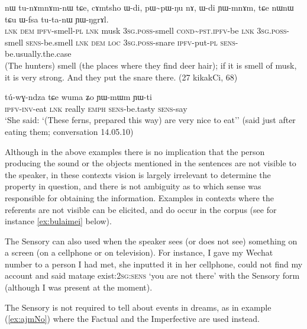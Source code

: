 \documentclass[oldfontcommands,oneside,a4paper,11pt]{article}
\newcommand{\ipa}[1]{{\phon \mbox{#1}}} %
\newcommand{\refb}[1]{(\ref{#1})}
\newcommand{\rdp}{\textasciitilde{}}
\begin{document}
\begin{exe}
\ex \label{ex:tunAmnAmnW}
\gll \ipa{tɕe} 	\ipa{nɯ} 	\ipa{tu-nɤmnɤm-nɯ} 	\ipa{tɕe,} 	\ipa{cɤmtsho} 	\ipa{ɯ-di,} 	\ipa{pɯ\rdp{}pɯ-ŋu} 	\ipa{nɤ,} 	\ipa{ɯ-di} 	\ipa{ɲɯ-mnɤm,} \ipa{tɕe} 	\ipa{nɯnɯ} 	\ipa{tɕu} 	\ipa{ɯ-fsa} 	\ipa{tu-ta-nɯ} 	\ipa{ɲɯ-ŋgrɤl.} \\
\textsc{lnk} \textsc{dem} \textsc{ipfv}-smell-\textsc{pl} \textsc{lnk} musk \textsc{3sg.poss}-smell \textsc{cond\rdp{}pst.ipfv}-be \textsc{lnk} \textsc{3sg.poss}-smell \textsc{sens}-be.smell \textsc{lnk} \textsc{dem} \textsc{loc} \textsc{3sg.poss}-snare \textsc{ipfv}-put-\textsc{pl} \textsc{sens}-be.usually.the.case \\
\glt (The hunters) smell (the places where they find deer hair); if it is smell of musk, it is very strong. And they put the snare there. (27 kikakCi, 68)
\end{exe}

\begin{exe}
\ex \label{ex:YWmWm}
\gll
\ipa{tú-wɣ-ndza} 	\ipa{tɕe} 	\ipa{wuma} 	\ipa{ʑo} 	\ipa{ɲɯ-mɯm} 	\ipa{ɲɯ-ti} \\
\textsc{ipfv-inv}-eat \textsc{lnk} really \textsc{emph} \textsc{sens}-be.tasty \textsc{sens}-say \\
\glt `She said: `(These ferns, prepared this way) are very nice to eat'' (said just after eating them; conversation 14.05.10)
\end{exe}

Although in the above examples there is no implication that the person producing the sound or the objects mentioned in the sentences are not visible to the speaker, in these contexts vision is largely irrelevant to determine the property in question, and there is not ambiguity as to which sense was responsible for obtaining the information. Examples in contexts where the referents are not visible can be elicited, and do occur in the corpus (see for instance \ref{ex:bulaimei} below). 

The Sensory can also used when the speaker sees (or does not see) something on a screen (on a cellphone or on television). For instance, I gave my Wechat number to a person I had met, she inputted it in her cellphone, could not find my account and said \ipa{mataŋe} exist:\textsc{2sg:sens} `you are not there' with the Sensory form (although I was present at the moment).

The Sensory is not required to tell about events in dreams, as in example \refb{ex:ajmNo} where the Factual and the Imperfective are used instead.
\end{document}
